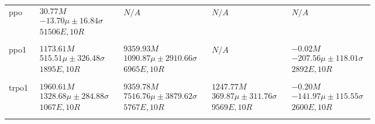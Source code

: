 \begin{tabular}{|l|p{3.2cm}|p{3.2cm}|p{3.2cm}|p{3.2cm}|}
ppo & $\begin{array}{c} 30.77M \\ -13.70\mu \pm 16.84\sigma \\ 51506E, 10R \end{array}$ & $\begin{array}{c} N/A \end{array}$ & $\begin{array}{c} N/A \end{array}$ & $\begin{array}{c} N/A \end{array}$ \\ \\ \hline
ppo1 & $\begin{array}{c} 1173.61M \\ 515.51\mu \pm 326.48\sigma \\ 1895E, 10R \end{array}$ & $\begin{array}{c} 9359.93M \\ 1090.87\mu \pm 2910.66\sigma \\ 6965E, 10R \end{array}$ & $\begin{array}{c} N/A \end{array}$ & $\begin{array}{c} -0.02M \\ -207.56\mu \pm 118.01\sigma \\ 2892E, 10R \end{array}$ \\ \\ \hline
trpo1 & $\begin{array}{c} 1960.61M \\ 1328.68\mu \pm 284.88\sigma \\ 1067E, 10R \end{array}$ & $\begin{array}{c} 9359.78M \\ 7516.76\mu \pm 3879.62\sigma \\ 5767E, 10R \end{array}$ & $\begin{array}{c} 1247.77M \\ 369.87\mu \pm 311.76\sigma \\ 9569E, 10R \end{array}$ & $\begin{array}{c} -0.20M \\ -141.97\mu \pm 115.55\sigma \\ 2600E, 10R \end{array}$ \\ \\ \hline

\end{tabular}
